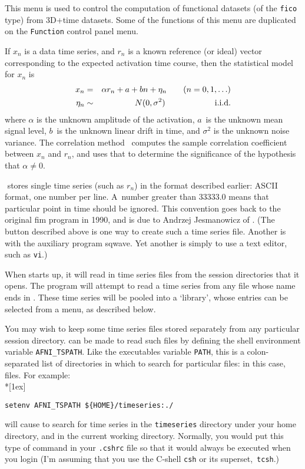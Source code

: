 This menu is used to control the computation of functional datasets (of the
{\tt fico} type) from 3D+time datasets.  Some of the functions of this
menu are duplicated on the {\tt Function} control panel  menu.

If $x_n$ is a data time series, and $r_n$ is a known reference (or ideal)
vector corresponding to the expected activation time course, then
the statistical model for $x_n$ is
\begin{eqnarray*}
  x_n    &=& \alpha r_n + a + b n + \eta_n \qquad (n=0,1,\ldots) \\*
  \eta_n &\sim& N(0,\sigma^2) \qquad\qquad\qquad \hbox{i.i.d.}
\end{eqnarray*}
where $\alpha$ is the unknown amplitude of the activation,
$a$~is the unknown mean signal level, $b$~is the unknown linear drift in
time, and $\sigma^2$ is the unknown noise variance.  The correlation
method~\cite{Bandettini,Cox-Rtime} computes the sample
correlation coefficient between $x_n$ and $r_n$, and uses that to
determine the significance of the hypothesis that $\alpha \neq 0$.

\MCW$\!$ \afnit stores single time series (such as $r_n$) in the format
described earlier: ASCII format, one number per line.  A~number greater
than $33333.0$ means that particular point in time should be ignored.
This convention goes back to the original {\sf fim} program in 1990, and
is due to Andrzej Jesmanowicz of \MCW.
(The  button described above is one way to create
such a time series file.  Another is with the auxiliary program {\sf sqwave}.
Yet another is simply to use a text editor, such as {\tt vi}.)

When \afnit starts up, it will read in time series files from the session
directories that it opens.  The program will attempt to read a time series
from any file whose name ends in .
These time series will be pooled into
a `library', whose entries can be selected from a menu, as described below.

You may wish to keep some time series files stored separately from any
particular session directory.  \afnit can be made to read such files
by defining the shell environment variable {\tt AFNI\_TSPATH}.
Like the executables variable {\tt PATH}, this is a colon-separated
list of directories in which to search for particular files: in this
case,  files.  For example:\\*[1ex]
\centerline{\tt setenv AFNI\_TSPATH \$\{HOME\}/timeseries:./}\vspace{1ex}
will cause \afnit to search for time series in the {\tt timeseries} directory under
your home directory, and in the current working directory.
Normally, you would put this type of command in your {\tt .cshrc} file so that
it would always be executed when you login (I'm assuming
that you use the C-shell {\tt csh} or its superset,~{\tt tcsh}.)

